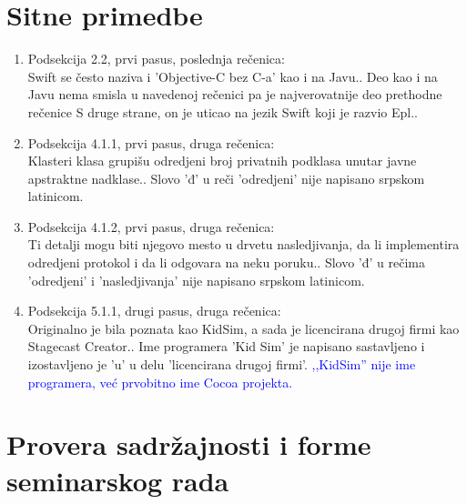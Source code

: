 \documentclass[a4paper]{report}
\newcommand{\odgovor}[1]{\textcolor{blue}{#1}}
\begin{document}
\section{Sitne primedbe}
\begin{enumerate}
	
	\item Podsekcija 2.2, prvi pasus, poslednja rečenica: \\
	\textquotedbl Swift se često naziva i 'Objective-C bez C-a' kao i na Javu.\textquotedbl{}. Deo \textquotedbl kao i na Javu\textquotedbl{} nema smisla u navedenoj rečenici pa je najverovatnije deo prethodne rečenice \textquotedbl S druge
	strane, on je uticao na jezik Swift koji je razvio Epl.\textquotedbl{}.
	
	\item Podsekcija 4.1.1, prvi pasus, druga rečenica: \\
	\textquotedbl Klasteri klasa grupišu
	odredjeni broj privatnih podklasa unutar javne apstraktne nadklase.\textquotedbl{}. Slovo 'đ' u reči 'odredjeni' nije napisano srpskom latinicom.
	
	\item Podsekcija 4.1.2, prvi pasus, druga rečenica: \\
	\textquotedbl Ti detalji mogu biti njegovo
	mesto u drvetu nasledjivanja, da li implementira odredjeni protokol i da li odgovara na neku poruku.\textquotedbl{}. Slovo 'đ' u rečima 'odredjeni' i 'nasledjivanja' nije napisano srpskom latinicom.
	
	\item Podsekcija 5.1.1, drugi pasus, druga rečenica: \\
	\textquotedbl Originalno je bila poznata kao KidSim, a sada je licencirana drugoj firmi kao Stagecast Creator.\textquotedbl{}. Ime programera 'Kid Sim' je napisano sastavljeno i izostavljeno je 'u' u delu 'licencirana drugoj firmi'.
	\odgovor{,,KidSim'' nije ime programera, već prvobitno ime Cocoa projekta.}
	
\end{enumerate}

\section{Provera sadržajnosti i forme seminarskog rada}
\end{document}
